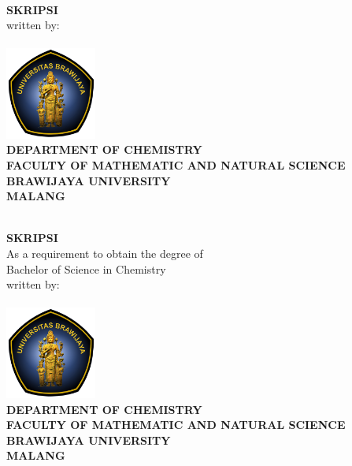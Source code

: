 \makeatletter
\begin{titlepage}

	\begin{center}
	\textbf{\Large \@title}\\[1.5cm]
	\textbf{\large SKRIPSI}\\[1.75cm]
	written by: \\
	\textsc{\@author}\\
	\textsc{\NIM}
	\vfill
	\includegraphics[width=3cm]{figure/logo-ub-color.png} \\[1.25 cm]
	\small{\textbf{\small DEPARTMENT OF CHEMISTRY \\
FACULTY OF MATHEMATIC AND NATURAL SCIENCE \\
BRAWIJAYA UNIVERSITY\\
MALANG \\
\TahunSkripsi}}
	\end{center}
\end{titlepage}
	
	
	\begin{center}
	\textbf{\Large \@title}\\[1.5cm]
	\textbf{\large SKRIPSI}\\[1.5cm]
	As a requirement to obtain the degree of \\ Bachelor of Science in Chemistry \\[0.75cm]
	written by: \\
	\textsc{\@author}\\
	\textsc{\NIM}
	\vfill
	\includegraphics[width=3cm]{figure/logo-ub-color.png} \\[1 cm]
	\small{\textbf{\small DEPARTMENT OF CHEMISTRY \\
FACULTY OF MATHEMATIC AND NATURAL SCIENCE \\
BRAWIJAYA UNIVERSITY \\
MALANG \\
\TahunSkripsi}}
	\end{center}
	
